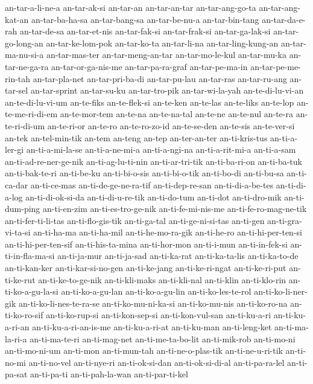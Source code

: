 {an-tar-a-li-ne-a an-tar-ak-si an-tar-an an-tar-an-tar an-tar-ang-go-ta
an-tar-ang-kat-an an-tar-ba-ha-sa an-tar-bang-sa an-tar-be-nu-a
an-tar-bin-tang an-tar-da-e-rah an-tar-de-sa an-tar-et-nis an-tar-fak-si
an-tar-frak-si an-tar-ga-lak-si an-tar-go-long-an an-tar-ke-lom-pok
an-tar-ko-ta an-tar-li-na an-tar-ling-kung-an an-tar-ma-nu-si-a
an-tar-mas-ter an-tar-meng-an-tar an-tar-mo-le-kul an-tar-mu-ka
an-tar-ne-ga-ra an-tar-or-ga-nis-me an-tar-pa-ra-graf an-tar-pe-ma-in
an-tar-pe-me-rin-tah an-tar-pla-net an-tar-pri-ba-di an-tar-pu-lau
an-tar-ras an-tar-ru-ang an-tar-sel an-tar-sprint an-tar-su-ku
an-tar-tro-pik an-tar-wi-la-yah an-te-di-lu-vi-an an-te-di-lu-vi-um
an-te-fiks an-te-flek-si an-te-ken an-te-las an-te-liks an-te-lop
an-te-me-ri-di-em an-te-mor-tem an-te-na an-te-na-tal an-te-ne an-te-nul
an-te-ra an-te-ri-di-um an-te-ri-or an-te-ro an-te-ro-zo-id an-te-se-den
an-te-sis an-te-ver-si an-tek an-tel-min-tik an-tem an-teng an-tep
an-ter-an-ter an-ti-kris-tus an-ti-a-ler-gi an-ti-a-mi-la-se
an-ti-a-ne-mi-a an-ti-a-ngi-na an-ti-a-rit-mi-a an-ti-a-sam
an-ti-ad-re-ner-ge-nik an-ti-ag-lu-ti-nin an-ti-ar-tri-tik an-ti-ba-ri-on
an-ti-ba-tuk an-ti-bak-te-ri an-ti-be-ku an-ti-bi-o-sis an-ti-bi-o-tik
an-ti-bo-di an-ti-bu-sa an-ti-ca-dar an-ti-ce-mas an-ti-de-ge-ne-ra-tif
an-ti-dep-re-san an-ti-di-a-be-tes an-ti-di-a-log an-ti-di-ok-si-da
an-ti-di-u-re-tik an-ti-do-tum an-ti-dot an-ti-dro-mik an-ti-dum-ping
an-ti-en-zim an-ti-es-tro-ge-nik an-ti-fe-mi-nis-me an-ti-fe-ro-mag-ne-tik
an-ti-fer-ti-li-tas an-ti-flo-gis-tik an-ti-ga-tal an-ti-ge-ni-si-tas
an-ti-gen an-ti-gra-vi-ta-si an-ti-ha-ma an-ti-ha-mil an-ti-he-mo-ra-gik
an-ti-he-ro an-ti-hi-per-ten-si an-ti-hi-per-ten-sif an-ti-his-ta-mina
an-ti-hor-mon an-ti-i-mun an-ti-in-fek-si an-ti-in-fla-ma-si an-ti-ja-mur
an-ti-ja-sad an-ti-ka-rat an-ti-ka-ta-lis an-ti-ka-to-de an-ti-kan-ker
an-ti-kar-si-no-gen an-ti-ke-jang an-ti-ke-ri-ngat an-ti-ke-ri-put
an-ti-ke-rut an-ti-ke-to-ge-nik an-ti-kli-maks an-ti-kli-nal an-ti-klin
an-ti-klo-rin an-ti-ko-a-gu-la-si an-ti-ko-a-gu-lan an-ti-ko-a-gu-lin
an-ti-ko-les-te-rol an-ti-ko-li-ner-gik an-ti-ko-li-nes-te-ra-se
an-ti-ko-mu-ni-ka-si an-ti-ko-mu-nis an-ti-ko-ro-na an-ti-ko-ro-sif
an-ti-ko-rup-si an-ti-kon-sep-si an-ti-kon-vul-san an-ti-ku-a-ri
an-ti-ku-a-ri-an an-ti-ku-a-ri-an-is-me an-ti-ku-a-ri-at an-ti-ku-man
an-ti-leng-ket an-ti-ma-la-ri-a an-ti-ma-te-ri an-ti-mag-net
an-ti-me-ta-bo-lit an-ti-mik-rob an-ti-mo-ni an-ti-mo-ni-um an-ti-mon
an-ti-mun-tah an-ti-ne-o-plas-tik an-ti-ne-u-ri-tik an-ti-no-mi
an-ti-no-vel an-ti-nye-ri an-ti-ok-si-dan an-ti-ok-si-di-al
an-ti-pa-ra-lel an-ti-pa-sat an-ti-pa-ti an-ti-pah-la-wan an-ti-par-ti-kel
}

